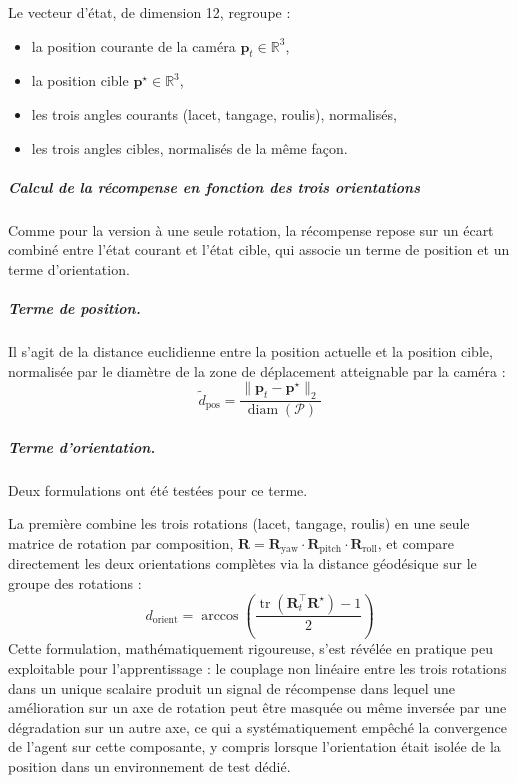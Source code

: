 Le vecteur d'état, de dimension 12, regroupe :
\begin{itemize}
    \item la position courante de la caméra $\mathbf{p}_t \in \mathbb{R}^3$,
    \item la position cible $\mathbf{p}^\star \in \mathbb{R}^3$,
    \item les trois angles courants (lacet, tangage, roulis), normalisés,
    \item les trois angles cibles, normalisés de la même façon.
\end{itemize}



\subparagraph*{Calcul de la récompense en fonction des trois orientations}

Comme pour la version à une seule rotation, la récompense repose sur un
écart combiné entre l'état courant et l'état cible, qui associe un terme de
position et un terme d'orientation.

\subparagraph*{Terme de position.} Il s'agit de la distance euclidienne entre
la position actuelle et la position cible, normalisée par le diamètre de la
zone de déplacement atteignable par la caméra :
\begin{equation}
    \tilde{d}_{\text{pos}} = \frac{\lVert \mathbf{p}_t - \mathbf{p}^\star \rVert_2}{\operatorname{diam}(\mathcal{P})}
\end{equation}

\subparagraph*{Terme d'orientation.} Deux formulations ont été testées pour ce
terme.

La première combine les trois rotations (lacet, tangage, roulis) en une
seule matrice de rotation par composition, $\mathbf{R} = \mathbf{R}_{\text{yaw}}
\cdot \mathbf{R}_{\text{pitch}} \cdot \mathbf{R}_{\text{roll}}$, et compare
directement les deux orientations complètes via la distance géodésique sur
le groupe des rotations :
\begin{equation}
    d_{\text{orient}} = \arccos\left(\frac{\operatorname{tr}(\mathbf{R}_t^\top \mathbf{R}^\star) - 1}{2}\right)
\end{equation}
Cette formulation, mathématiquement rigoureuse, s'est révélée en pratique
peu exploitable pour l'apprentissage : le couplage non linéaire entre les
trois rotations dans un unique scalaire produit un signal de récompense
dans lequel une amélioration sur un axe de rotation peut être masquée ou
même inversée par une dégradation sur un autre axe, ce qui a systématiquement
empêché la convergence de l'agent sur cette composante, y compris lorsque
l'orientation était isolée de la position dans un environnement de test
dédié.

